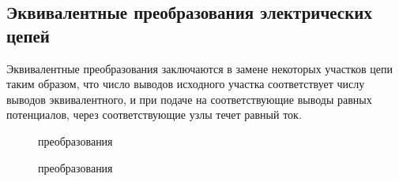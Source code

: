 \subsection{Эквивалентные преобразования электрических цепей}

Эквивалентные преобразования заключаются в замене некоторых участков цепи таким образом, что число выводов исходного участка соответствует числу выводов эквивалентного, и при подаче на соответствующие выводы равных потенциалов, через соответствующие узлы течет равный ток.

\begin{center}
	\begin{figure}[h!]
		\caption{преобразования}	
	\end{figure}
\end{center}	

\begin{center}
	\begin{figure}[h!]
		\caption{преобразования}	
	\end{figure}
\end{center}	

\pagebreak